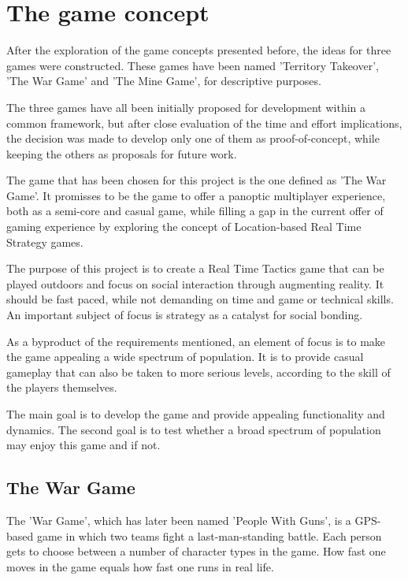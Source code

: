 \section{The game concept}

After the exploration of the game concepts presented before, the ideas for three
games were constructed. These games have been named 'Territory Takeover', 'The
War Game' and 'The Mine Game', for descriptive purposes.\newline 

The three games have all been initially proposed for development within a common
framework, but after close evaluation of the time and effort implications, the
decision was made to develop only one of them as proof-of-concept, while keeping
the others as proposals for future work.\newline

The game that has been chosen for this project is the one defined as 'The War
Game'. It promisses to be the game to offer a panoptic multiplayer experience,
both as a semi-core and casual game, while filling a gap in the current offer of
gaming experience by exploring the concept of Location-based Real Time Strategy
games. \newline

The purpose of this project is to create a Real Time Tactics game that can be
played outdoors and focus on social interaction through augmenting reality. It
should be fast paced, while not demanding on time and game or technical skills.
An important subject of focus is strategy as a catalyst for social
bonding.\newline

As a byproduct of the requirements mentioned, an element of focus is to make the
game appealing a wide spectrum of population. It is to provide casual gameplay
that can also be taken to more serious levels, according to the skill of the
players themselves.\newline

The main goal is to develop the game and provide appealing functionality and
dynamics. The second goal is to test whether a broad spectrum of population may
enjoy this game and if not. \newline


\subsection{The War Game}

The 'War Game', which has later been named 'People With Guns', is a GPS-based
game in which two teams fight a last-man-standing battle. Each person gets to
choose between a number of character types in the game. How fast one moves in
the game equals how fast one runs in real life.\newline

